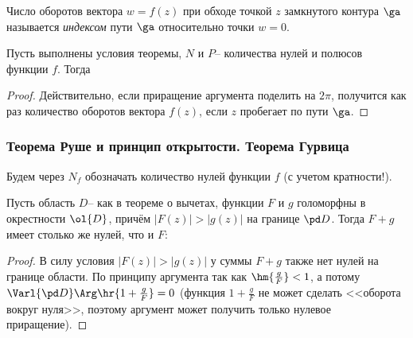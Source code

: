 \documentclass[a4paper]{article}
\begin{document}
\begin{df}
Число оборотов вектора $w = f(z)$ при обходе
точкой $z$ замкнутого контура $\ga$ называется
\emph{индексом} пути $\ga$ относительно точки $w=0$.
\end{df}

\begin{imp}
Пусть выполнены условия теоремы, $N$ и $P$-- количества нулей и полюсов функции $f$. Тогда
\end{imp}
\begin{proof}
Действительно, если приращение аргумента поделить на $2\pi$, получится как раз количество
оборотов вектора $f(z)$, если $z$ пробегает по пути $\ga$.
\end{proof}

\subsubsection{Теорема Руше и принцип открытости. Теорема Гурвица}

Будем через $N_f$ обозначать количество нулей функции $f$ (с учетом кратности!).

\begin{theorem}[Руше]
Пусть область $D$-- как в теореме о вычетах, функции $F$ и $g$ голоморфны в окрестности $\ol{D}$,
причём $|F(z)|>|g(z)|$ на границе $\pd D$. Тогда $F+g$ имеет столько же нулей, что и $F$:
\end{theorem}
\begin{proof}
В силу условия $|F(z)| > |g(z)|$ у суммы $F+g$ также нет нулей на границе области.
По принципу аргумента
так как $\hm{\frac{g}{F}} < 1$, а потому $\Varl{\pd D} \Arg \hr{1+\frac{g}{F}}=0$ (функция $1 + \frac{g}{F}$ не может
сделать <<оборота вокруг нуля>>, поэтому аргумент может получить только нулевое приращение).
\end{proof}
\end{document}
